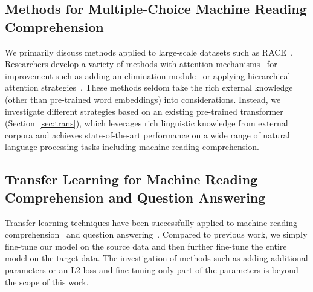 \documentclass[11pt,a4paper]{article}
\begin{document}
\label{sec:related}



\subsection{Methods for Multiple-Choice Machine Reading Comprehension}


We primarily discuss methods applied to large-scale datasets such as RACE~\cite{lai2017race}. Researchers develop a variety of methods with attention mechanisms~\cite{chen2016thorough,dhingra2017gated,dfn2018,tay2018multi,tang2019multi} for improvement such as adding an elimination module~\cite{parikh2018eliminet} or applying hierarchical attention strategies~\cite{haf2017,wang2018co}. These methods seldom take the rich external knowledge (other than pre-trained word embeddings) into considerations. Instead, we investigate different strategies based on an existing pre-trained transformer~\cite{radfordimproving} (Section~\ref{sec:trans}), which leverages rich linguistic knowledge from external corpora and achieves state-of-the-art performance on a wide range of natural language processing tasks including machine reading comprehension.  


\subsection{Transfer Learning for Machine Reading Comprehension and Question Answering}
Transfer learning techniques have been successfully applied to machine reading comprehension~\cite{golub2017two,chung2017supervised} and question answering~\cite{min2017question,wiese2017neural}. Compared to previous work, we simply fine-tune our model on the source data and then further fine-tune the entire model on the target data. The investigation of methods such as adding additional parameters or an L2 loss and fine-tuning only part of the parameters is beyond the scope of this work.
\end{document}
